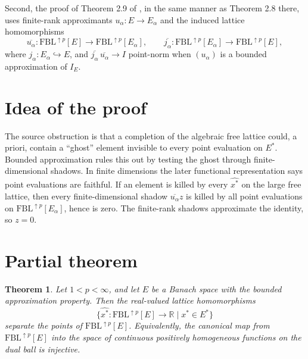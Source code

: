 \documentclass[11pt]{amsart}
\newtheorem{theorem}{Theorem}
\newcommand{\FBL}{\mathrm{FBL}}
\newcommand{\R}{\mathbb R}
\begin{document}
Second, the proof of Theorem 2.9 of \cite{Oikhberg2023}, in the same manner
as Theorem 2.8 there, uses finite-rank approximants \(u_\alpha:E\to E_\alpha\)
and the induced lattice homomorphisms
\[
  \overline{u_\alpha}\colon \FBL^{\uparrow p}[E]\to
  \FBL^{\uparrow p}[E_\alpha],
  \qquad
  \overline{j_\alpha}\colon \FBL^{\uparrow p}[E_\alpha]\to
  \FBL^{\uparrow p}[E],
\]
where \(j_\alpha:E_\alpha\hookrightarrow E\), and
\(\overline{j_\alpha}\,\overline{u_\alpha}\to I\) point-norm when
\((u_\alpha)\) is a bounded approximation of \(I_E\).

\section*{Idea of the proof}

The source obstruction is that a completion of the algebraic free lattice
could, a priori, contain a ``ghost'' element invisible to every point
evaluation on \(E^*\).  Bounded approximation rules this out by testing the
ghost through finite-dimensional shadows.  In finite dimensions the later
functional representation says point evaluations are faithful.  If an element
is killed by every \(\widehat{x^*}\) on the large free lattice, then every
finite-dimensional shadow \(\overline{u_\alpha}z\) is killed by all point
evaluations on \(\FBL^{\uparrow p}[E_\alpha]\), hence is zero.  The finite-rank
shadows approximate the identity, so \(z=0\).

\section*{Partial theorem}

\begin{theorem}
Let \(1<p<\infty\), and let \(E\) be a Banach space with the bounded
approximation property.  Then the real-valued lattice homomorphisms
\[
  \{\widehat{x^*}:\FBL^{\uparrow p}[E]\to\R \mid x^*\in E^*\}
\]
separate the points of \(\FBL^{\uparrow p}[E]\).  Equivalently, the canonical
map from \(\FBL^{\uparrow p}[E]\) into the space of continuous positively
homogeneous functions on the dual ball is injective.
\end{theorem}
\end{document}
